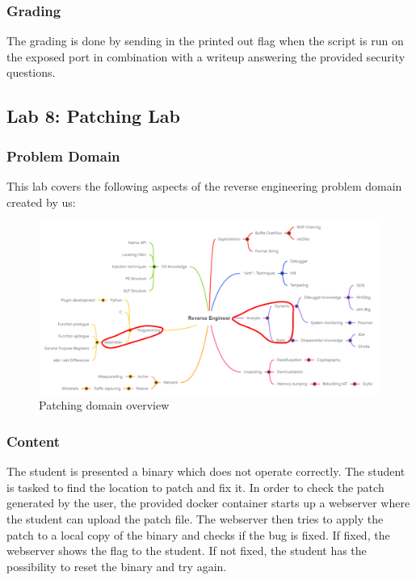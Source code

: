 \subsubsection*{Grading}
The grading is done by sending in the printed out flag when the script is run on the exposed port in combination with a writeup answering the provided security questions.
\pagebreak

\subsection{Lab 8: Patching Lab}
\subsubsection*{Problem Domain}
This lab covers the following aspects of the reverse engineering problem domain created by us:
\vspace{-2ex}
\begin{figure}[H]
    \includegraphics[width=\textwidth]{resources/patching-overview-light.png}
    \caption{Patching domain overview}
    \label{fig:patching-overview}
\end{figure}
\subsubsection*{Content}
The student is presented a binary which does not operate correctly. The student is tasked to find the location to patch and fix it. In order to check the patch generated by the user, the provided docker container starts up a webserver where the student can upload the patch file. The webserver then tries to apply the patch to a local copy of the binary and checks if the bug is fixed. If fixed, the webserver shows the flag to the student. If not fixed, the student has the possibility to reset the binary and try again.

